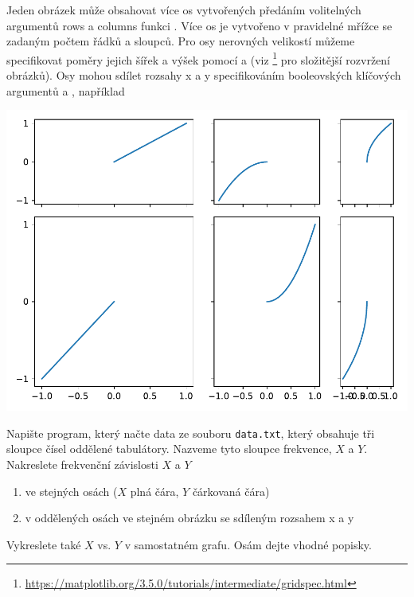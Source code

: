 Jeden obrázek může obsahovat více os vytvořených předáním volitelných argumentů rows a columns funkci . Více os je vytvořeno v pravidelné mřížce se zadaným počtem řádků a sloupců. Pro osy nerovných velikostí můžeme specifikovat poměry jejich šířek a výšek pomocí  a  (viz  \footnote{\url{https://matplotlib.org/3.5.0/tutorials/intermediate/gridspec.html}} pro složitější rozvržení obrázků). Osy mohou sdílet rozsahy x a y specifikováním booleovských klíčových argumentů  a , například

\begin{center}
    \includegraphics[width=0.5\linewidth]{multiax.pdf}
\end{center}
\begin{exercise}
    \label{ex:peak}
    Napište program, který načte data ze souboru \verb|data.txt|, který obsahuje tři sloupce čísel oddělené tabulátory. Nazveme tyto sloupce frekvence, $X$ a $Y$. Nakreslete frekvenční závislosti $X$ a $Y$
    \begin{enumerate}
        \item ve stejných osách ($X$ plná čára, $Y$ čárkovaná čára)
        \item v oddělených osách ve stejném obrázku se sdíleným rozsahem x a y
    \end{enumerate}
    Vykreslete také $X$ vs. $Y$ v samostatném grafu. Osám dejte vhodné popisky.
\end{exercise}
